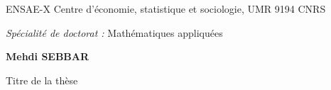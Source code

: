 \documentclass[a4paper,12pt]{book}
\begin{document}
\begin{center}
ENSAE-X Centre d'\'economie, statistique et sociologie, UMR 9194 CNRS\\
\vspace*{0.2cm}
\end{center}

\begin{center}
{\it Sp\'ecialit\'e de doctorat : } 
{\large Math\'ematiques appliquées}
\end{center}
\vspace{5mm}

\begin{center}
{\large\bf Mehdi SEBBAR}
\end{center}

\vspace{3mm}
 
\begin{center}
{\Large Titre de la th\`ese}
\end{center}
\end{document}
